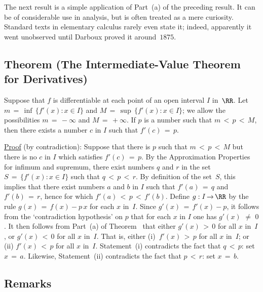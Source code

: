         The next result is a simple application of Part~(a) of the preceding result. It can be of considerable use in analysis, but is often treated as a mere curiosity.
    Standard texts in elementary calculus rarely even state it; indeed, apparently it went unobserved until Darboux proved it around~$1875$.
    
\V

            \subsection{\small{\bf Theorem} (The Intermediate-Value Theorem for Derivatives)}
            \label{ThmE40.35}

\V

        Suppose that $f$ is differentiable at each point of an open interval $I$ in~${\RR}$.
    Let $m \,=\, {\inf}\,\{f'(x): x{\in}I\}$ and $M \,=\, {\sup}\,\{f'(x): x{\in}I\}$; we allow the possibilities $m \,=\, -{\infty}$ and $M \,=\, +{\infty}$.
    If $p$ is a number such that $m\,<\,p\,<\,M$, then there exists a number $c$ in $I$ such that $f'(c) \,=\, p$.

\V

        \underline{Proof} (by contradiction):  Suppose that there is $p$ such that $m\,<\,p\,<\,M$ but there is no $c$ in $I$ which satisfies $f'(c) \,=\, p$.
    By the Approximation Properties for infimum and supremum, there exist numbers $q$ and $r$ in the set $S \,=\, \{f'(x): x{\in}I\}$ such that $q\,<\,p\,<\,r$.
    By definition of the set~$S$, this implies that there exist numbers $a$ and $b$ in $I$ such that $f'(a) \,=\, q$ and $f'(b) \,=\, r$,
    hence for which $f'(a)\,<\,p\,<\,f'(b)$. Define $g:I \,{\rightarrow}\, {\RR}$ by the rule $g(x) \,=\, f(x) - p\,x$ for each $x$ in~$I$.
    Since $g'(x) \,=\, f'(x)-p$, it follows from the `contradiction hypothesis' on $p$ that for each $x$ in $I$ one has $g'(x) \,\,{\neq}\,\, 0$.
    It then follows from Part~(a) of Theorem~ that either $g'(x)\,>\,0$ for all $x$ in~$I$, or $g'(x)\,<\,0$ for all $x$ in~$I$.
    That is, either (i)\, $f'(x)\,>\,p$ for all $x$ in~$I$; or (ii) $f'(x)\,<\,p$ for all $x$ in~$I$.
    Statement~(i) contradicts the fact that $q\,<\,p$: set $x \,=\, a$. Likewise, Statement~(ii) contradicts the fact that $p\,<\,r$: set $x \,=\, b$. \Q

\VV


            \subsection{\small{\bf Remarks}} 
            \label{RemrkE40.35B}


